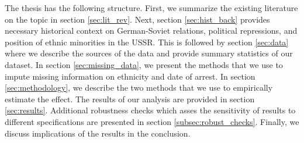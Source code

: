 The thesis has the following structure. First, we summarize the existing literature on the topic in section \ref{sec:lit_rev}. Next, section \ref{sec:hist_back} provides necessary historical context on German-Soviet relations, political repressions, and position of ethnic minorities in the USSR. This is followed by section \ref{sec:data} where we describe the sources of the data and provide summary statistics of our  dataset. 
In section \ref{sec:missing_data}, we present the methods that we use to impute missing information on ethnicity and  date of arrest. In section \ref{sec:methodology}, we  describe the two methods that we use to empirically estimate the effect. 
The results of our analysis  are provided in section \ref{sec:results}. Additional robustness checks which asses the sensitivity of results to different specifications are presented in section \ref{subsec:robust_checks}. Finally, we discuss implications of the results in the conclusion. 





